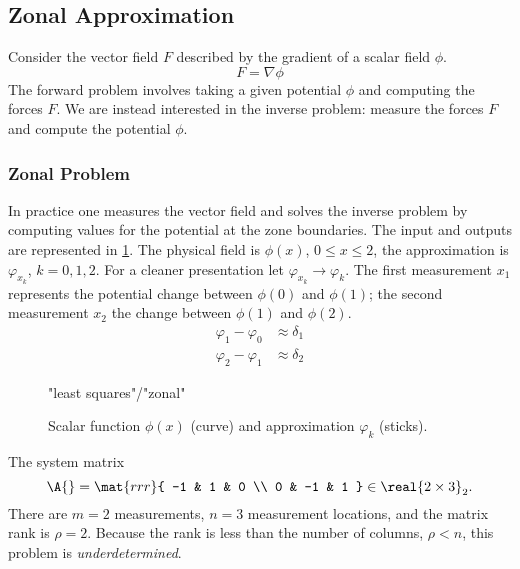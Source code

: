 \subsection{Zonal Approximation}  %
Consider the vector field $F$ described by the gradient of a scalar field $\phi$.
  \begin{equation*}   %
    F = \nabla \phi
  \end{equation*}
The forward problem involves taking a given potential $\phi$ and computing the forces $F$. We are instead interested in the inverse problem: measure the forces $F$ and compute the potential $\phi$.

\subsubsection{\label{ssec:zonal solution}Zonal Problem}  %
In practice one measures the vector field and solves the inverse problem by computing values for the potential at the zone boundaries. The input and outputs are represented in \ref{fig:sticks}. The physical field is $\phi(x)$, $0\le x \le 2$, the approximation is $\varphi_{x_{k}}$, $k=0,1,2$. For a cleaner presentation let $\varphi_{x_{k}} \rightarrow \varphi_{k}$. The first measurement $x_{1}$ represents the potential change between $\phi(0)$ and $\phi(1)$; the second measurement $x_{2}$ the change between $\phi(1)$ and $\phi(2)$.
  \begin{equation*}   %
    \begin{split}
      \varphi_{1} - \varphi_{0} &\approx \delta_{1} \\
      \varphi_{2} - \varphi_{1} &\approx \delta_{2}
    \end{split}
  \end{equation*}

\begin{figure}[htbp] %
   \centering
   \begin{overpic}[ scale = \myscale ]
	   {\pathgraphics "least squares"/"zonal"}
   \end{overpic}
   \caption[Scalar function $\phi$ and approximations.]{Scalar function $\phi(x)$ (curve) and approximation $\varphi_{k}$ (sticks).}
   \label{fig:sticks}
\end{figure}

The system matrix 
  \begin{equation*}   %
      \A{} =     \mat{rrr}{ 
      -1 & 1 & 0 \\
       0 & -1 & 1 } \in \real{2 \times 3}_{2}.
  \end{equation*}
There are $m = 2$ measurements, $n = 3$ measurement locations, and the matrix rank is $\rho = 2$. Because the rank is less than the number of columns, $\rho < n$, this problem is \emph{underdetermined}.

